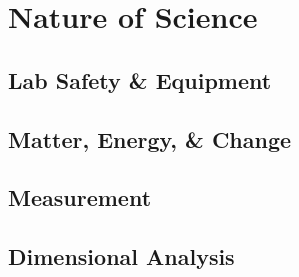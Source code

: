 \documentclass[../hchem.tex]{subfiles}
\begin{document}
\chapter{Nature of Science}
\section{Lab Safety \& Equipment}
\section{Matter, Energy, \& Change}
\section{Measurement}
\section{Dimensional Analysis}
\end{document}
